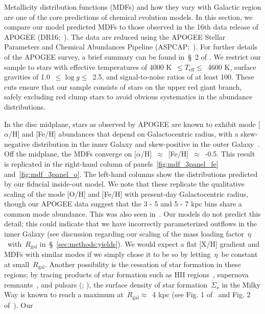 \documentclass[fleqn, usenatbib]{mnras}
\begin{document}
Metallicity distribution functions (MDFs) and how they vary with Galactic 
region are one of the core predictions of chemical evolution models. In this 
section, we compare our model predicted MDFs to those observed in the 16th 
data release of APOGEE (DR16;~\citealp{Ahumada2020, Majewski2017}). The 
data are reduced using the APOGEE Stellar Parameters and Chemical Abundances 
Pipeline (ASPCAP;~\citealp{Holtzman2015, GarciaPerez2016}). For further details 
of the APOGEE survey, a brief summary can be found in~\S~2 of 
\citet{Weinberg2019}. We restrict our sample to stars with effective 
temperatures of 4000 K~$\leq T_\text{eff} \leq$~4600 K, surface gravities of 
1.0~$\leq \log g \leq$~2.5, and signal-to-noise ratios of at least 100. These 
cuts ensure that our sample consists of stars on the upper red giant branch, 
safely excluding red clump stars to avoid obvious systematics in the 
abundance distributions. 
\par 
In the disc midplane, stars as observed by APOGEE are known to exhibit mode 
[$\alpha$/H] and [Fe/H] abundances that depend on Galactocentric radius, with a 
skew-negative distribution in the inner Galaxy and skew-positive in the outer 
Galaxy~\citep{Hayden2015, Weinberg2019}. Off the midplane, the MDFs converge on 
[$\alpha$/H]~$\approx$~[Fe/H]~$\approx$~-0.5. This result is replicated in the 
right-hand column of panels~\ref{fig:mdf_3panel_fe} and~\ref{fig:mdf_3panel_o}. 
The left-hand columns show the distributions predicted by our fiducial 
inside-out model. We note that these replicate the qualitative scaling of the 
mode [O/H] and [Fe/H] with present-day Galactocentric radius, though our APOGEE 
data suggest that the 3 - 5 and 5 - 7 kpc bins share a common mode abundance. 
This was also seen in~\citet{Hayden2015}. Our models do not predict this 
detail; this could indicate that we have incorrectly parameterized outflows in 
the inner Galaxy (see discussion regarding our scaling of the mass loading 
factor~$\eta$~with~$R_\text{gal}$ in~\S~\ref{sec:methods:yields}). We would 
expect a flat [X/H] gradient and MDFs with similar modes if we simply chose it 
to be so by letting~$\eta$~be constant at small~$R_\text{gal}$. Another 
possibility is the cessation of star formation in these regions; by tracing 
products of star formation such as HII regions~\citep{Guesten1982}, supernova 
remnants~\citep{Leahy1989}, and pulsars (\citealp*{Lyne1985}; 
\citealp{Case1998}), the surface density of star formation~$\dot{\Sigma}_\star$ 
in the Milky Way is known to reach a maximum at~$R_\text{gal} \approx$~4 kpc 
(see Fig. 1 of~\citealt{Peek2009} and Fig. 2 of~\citealt{Fraternali2012}). Our 
\end{document}
